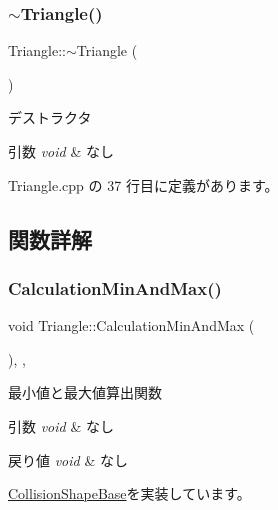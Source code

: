 \subsubsection{\texorpdfstring{$\sim$\+Triangle()}{~Triangle()}}
{\footnotesize\ttfamily Triangle\+::$\sim$\+Triangle (\begin{DoxyParamCaption}{ }\end{DoxyParamCaption})}



デストラクタ 


\begin{DoxyParams}{引数}
{\em void} & なし \\
\hline
\end{DoxyParams}


 Triangle.\+cpp の 37 行目に定義があります。



\subsection{関数詳解}
\mbox{\label{class_triangle_a8e8c4d3a0bb8a4dfb15429d38a3bdaaa}} 
\subsubsection{\texorpdfstring{Calculation\+Min\+And\+Max()}{CalculationMinAndMax()}}
{\footnotesize\ttfamily void Triangle\+::\+Calculation\+Min\+And\+Max (\begin{DoxyParamCaption}{ }\end{DoxyParamCaption})\hspace{0.3cm}{\ttfamily [override]}, {\ttfamily [private]}, {\ttfamily [virtual]}}



最小値と最大値算出関数 


\begin{DoxyParams}{引数}
{\em void} & なし \\
\hline
\end{DoxyParams}

\begin{DoxyRetVals}{戻り値}
{\em void} & なし \\
\hline
\end{DoxyRetVals}


\mbox{\hyperlink{class_collision_shape_base_ad227c2f83038d7c05bc6b1d510cb4000}{Collision\+Shape\+Base}}を実装しています。



